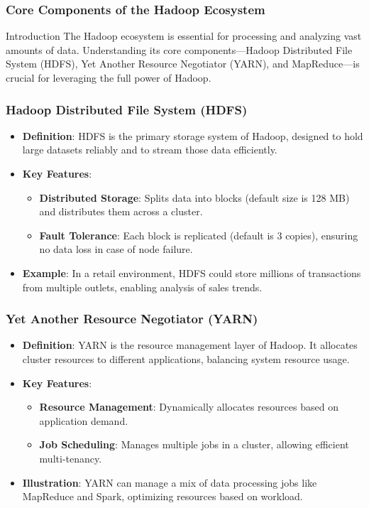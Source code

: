 \documentclass[aspectratio=169]{beamer}
\begin{document}
\begin{frame}[fragile]
    \frametitle{Core Components of the Hadoop Ecosystem}
    \begin{block}{Introduction}
        The Hadoop ecosystem is essential for processing and analyzing vast amounts of data. Understanding its core components—Hadoop Distributed File System (HDFS), Yet Another Resource Negotiator (YARN), and MapReduce—is crucial for leveraging the full power of Hadoop.
    \end{block}
\end{frame}

\begin{frame}[fragile]
    \frametitle{Hadoop Distributed File System (HDFS)}
    \begin{itemize}
        \item \textbf{Definition}: HDFS is the primary storage system of Hadoop, designed to hold large datasets reliably and to stream those data efficiently.
        \item \textbf{Key Features}:
        \begin{itemize}
            \item \textbf{Distributed Storage}: Splits data into blocks (default size is 128 MB) and distributes them across a cluster.
            \item \textbf{Fault Tolerance}: Each block is replicated (default is 3 copies), ensuring no data loss in case of node failure.
        \end{itemize}
        \item \textbf{Example}: In a retail environment, HDFS could store millions of transactions from multiple outlets, enabling analysis of sales trends.
    \end{itemize}
\end{frame}

\begin{frame}[fragile]
    \frametitle{Yet Another Resource Negotiator (YARN)}
    \begin{itemize}
        \item \textbf{Definition}: YARN is the resource management layer of Hadoop. It allocates cluster resources to different applications, balancing system resource usage.
        \item \textbf{Key Features}:
        \begin{itemize}
            \item \textbf{Resource Management}: Dynamically allocates resources based on application demand.
            \item \textbf{Job Scheduling}: Manages multiple jobs in a cluster, allowing efficient multi-tenancy.
        \end{itemize}
        \item \textbf{Illustration}: YARN can manage a mix of data processing jobs like MapReduce and Spark, optimizing resources based on workload.
    \end{itemize}
\end{frame}
\end{document}
